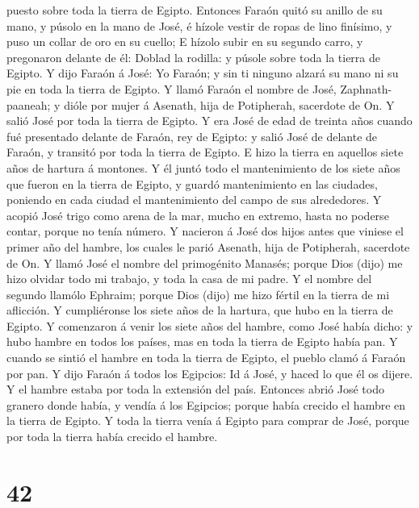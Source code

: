 puesto sobre toda la tierra de Egipto.  Entonces Faraón
quitó su anillo de su mano, y púsolo en la mano de José, é hízole vestir
de ropas de lino finísimo, y puso un collar de oro en su cuello;
 E hízolo subir en su segundo carro, y pregonaron delante
de él: Doblad la rodilla: y púsole sobre toda la tierra de Egipto.
 Y dijo Faraón á José: Yo Faraón; y sin ti ninguno alzará
su mano ni su pie en toda la tierra de Egipto.  Y llamó
Faraón el nombre de José, Zaphnath-paaneah; y dióle por mujer á Asenath,
hija de Potipherah, sacerdote de On. Y salió José por toda la tierra de
Egipto.  Y era José de edad de treinta años cuando fué
presentado delante de Faraón, rey de Egipto: y salió José de delante de
Faraón, y transitó por toda la tierra de Egipto.  E hizo
la tierra en aquellos siete años de hartura á montones. 
Y él juntó todo el mantenimiento de los siete años que fueron en la
tierra de Egipto, y guardó mantenimiento en las ciudades, poniendo en
cada ciudad el mantenimiento del campo de sus alrededores.
 Y acopió José trigo como arena de la mar, mucho en
extremo, hasta no poderse contar, porque no tenía número.
 Y nacieron á José dos hijos antes que viniese el primer
año del hambre, los cuales le parió Asenath, hija de Potipherah,
sacerdote de On.  Y llamó José el nombre del primogénito
Manasés; porque Dios (dijo) me hizo olvidar todo mi trabajo, y toda la
casa de mi padre.  Y el nombre del segundo llamólo
Ephraim; porque Dios (dijo) me hizo fértil en la tierra de mi aflicción.
 Y cumpliéronse los siete años de la hartura, que hubo en
la tierra de Egipto.  Y comenzaron á venir los siete años
del hambre, como José había dicho: y hubo hambre en todos los países,
mas en toda la tierra de Egipto había pan.  Y cuando se
sintió el hambre en toda la tierra de Egipto, el pueblo clamó á Faraón
por pan. Y dijo Faraón á todos los Egipcios: Id á José, y haced lo que
él os dijere.  Y el hambre estaba por toda la extensión
del país. Entonces abrió José todo granero donde había, y vendía á los
Egipcios; porque había crecido el hambre en la tierra de Egipto.
 Y toda la tierra venía á Egipto para comprar de José,
porque por toda la tierra había crecido el hambre.

\hypertarget{section-41}{%
\section{42}\label{section-41}}

